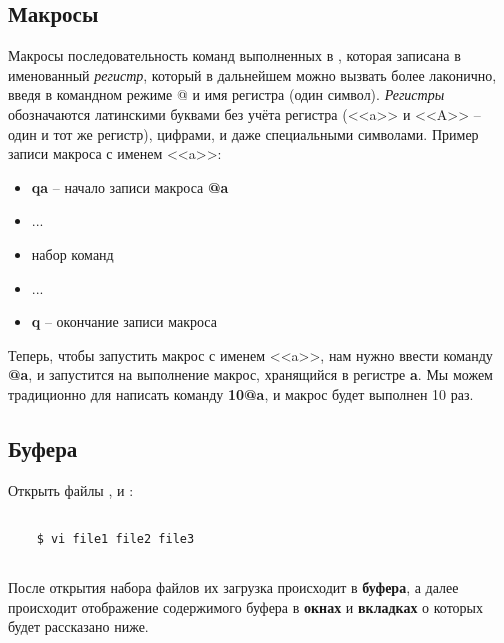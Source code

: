 \subsection*{Макросы}

Макросы последовательность команд выполненных в , которая записана в именованный \textit{регистр}, который в дальнейшем можно вызвать более лаконично, введя в командном режиме @ и имя регистра (один символ). \textit{Регистры} обозначаются латинскими буквами без учёта регистра (<<a>> и <<A>> -- один и тот же регистр), цифрами, и даже специальными символами. Пример записи макроса с именем <<a>>:
\begin{itemize}
\item \textbf{qa} -- начало записи макроса \textbf{@a}
\item ...
\item набор команд 
\item ...
\item \textbf{q} -- окончание записи макроса
\end{itemize}

Теперь, чтобы запустить макрос с именем <<a>>, нам нужно ввести команду \textbf{@a}, и запустится на выполнение макрос, хранящийся в регистре \textbf{a}. Мы можем традиционно для  написать команду \textbf{10@a}, и макрос будет выполнен 10 раз.

\subsection*{Буфера}

\noindent
Открыть файлы ,  и :
\begin{lstlisting}
	
	$ vi file1 file2 file3
	
\end{lstlisting}	

После открытия набора файлов их загрузка происходит в \textbf{буфера}, а далее происходит отображение содержимого буфера в \textbf{окнах} и \textbf{вкладках} о которых будет рассказано ниже.

\noindent
{}\\
\\
\\

\noindent
{}\\
\\
\\


